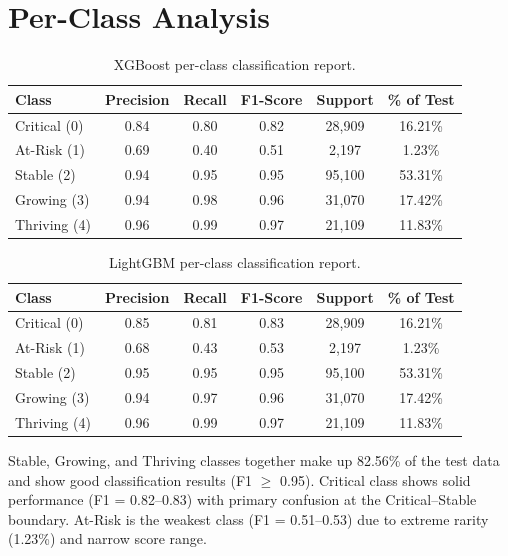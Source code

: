 \documentclass[12pt,a4paper]{report}
\begin{document}
\section{Per-Class Analysis}

\begin{table}[H]
\centering
\caption{XGBoost per-class classification report.}
\label{tab:xgb_class_report}
\begin{tabular}{lccccc}
\hline
\textbf{Class} & \textbf{Precision} & \textbf{Recall} & \textbf{F1-Score} & \textbf{Support} & \textbf{\% of Test} \\
\hline
Critical (0) & 0.84 & 0.80 & 0.82 & 28,909 & 16.21\% \\
At-Risk (1) & 0.69 & 0.40 & 0.51 & 2,197 & 1.23\% \\
Stable (2) & 0.94 & 0.95 & 0.95 & 95,100 & 53.31\% \\
Growing (3) & 0.94 & 0.98 & 0.96 & 31,070 & 17.42\% \\
Thriving (4) & 0.96 & 0.99 & 0.97 & 21,109 & 11.83\% \\
\hline
\end{tabular}
\end{table}

\begin{table}[H]
\centering
\caption{LightGBM per-class classification report.}
\label{tab:lgbm_class_report}
\begin{tabular}{lccccc}
\hline
\textbf{Class} & \textbf{Precision} & \textbf{Recall} & \textbf{F1-Score} & \textbf{Support} & \textbf{\% of Test} \\
\hline
Critical (0) & 0.85 & 0.81 & 0.83 & 28,909 & 16.21\% \\
At-Risk (1) & 0.68 & 0.43 & 0.53 & 2,197 & 1.23\% \\
Stable (2) & 0.95 & 0.95 & 0.95 & 95,100 & 53.31\% \\
Growing (3) & 0.94 & 0.97 & 0.96 & 31,070 & 17.42\% \\
Thriving (4) & 0.96 & 0.99 & 0.97 & 21,109 & 11.83\% \\
\hline
\end{tabular}
\end{table}

Stable, Growing, and Thriving classes together make up 82.56\% of the test data and show good classification results (F1 $\geq$ 0.95). Critical class shows solid performance (F1 = 0.82--0.83) with primary confusion at the Critical--Stable boundary. At-Risk is the weakest class (F1 = 0.51--0.53) due to extreme rarity (1.23\%) and narrow score range.
\end{document}
